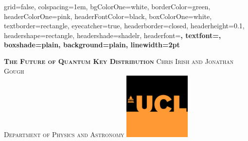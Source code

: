 \documentclass[portrait,final,archA0,fontscale=0.35]{baposter}
\begin{document}

\begin{poster}%
  {
  grid=false,
  colspacing=1em,
  bgColorOne=white,
  borderColor=green,
  headerColorOne=pink,
  headerFontColor=black,
  boxColorOne=white,
  textborder=rectangle,
  eyecatcher=true,
  headerborder=closed,
  headerheight=0.1\textheight,
  headershape=rectangle,
  headershade=shadelr,
  headerfont=\Large\bf\textsc, %
  textfont={\setlength{\parindent}{1.5em}},
  boxshade=plain,
  background=plain,
  linewidth=2pt
  }
  {\begin{minipage}{8em}
   \hfill\vspace{1in}
  \end{minipage} } %
  {\bf \textsc{  The Future of Quantum Key Distribution} }
  {\textsc{  Chris Irish and Jonathan Gough \\ Department of Physics and Astronomy}}
  {%
    \includegraphics[height=9.0em]{img/ucl_logo}
  }

    \newcommand{\colouredcircle}{%
      \tikz{\useasboundingbox (-0.2em,-0.32em) rectangle(0.2em,0.32em); \draw[draw=black,fill=lightblue,line width=0.03em] (0,0) circle(0.18em);}}


\end{poster}
\end{document}

